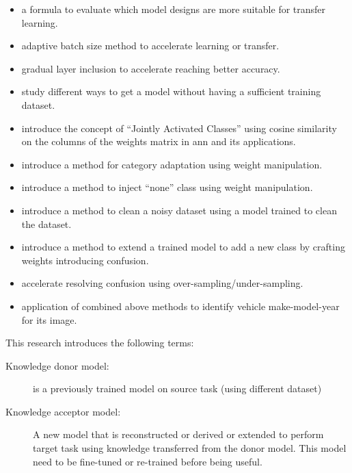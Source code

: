 \begin{itemize}
\item a formula to evaluate which model designs are more suitable for transfer learning.
\item adaptive batch size method to accelerate learning or transfer.
\item gradual layer inclusion to accelerate reaching better accuracy.
\item study different ways to get a model without having a sufficient training dataset.
\item introduce the concept of ``Jointly Activated Classes'' using cosine similarity on the columns of the weights matrix in \gls{ann} and its applications.
\item introduce a method for category adaptation using weight manipulation.
\item introduce a method to inject ``none'' class using weight manipulation.
\item introduce a method to clean a noisy dataset using a model trained to clean the dataset.
\item introduce a method to extend a trained model to add a new class by crafting weights introducing confusion.
\item accelerate resolving confusion using over-sampling/under-sampling.
\item application of combined above methods to identify vehicle make-model-year for its image.
\end{itemize}

This research introduces the following terms:
\begin{description}
\item [Knowledge donor model:] is a previously trained model on source task (using different dataset)
\item [Knowledge acceptor model:] A new model that is reconstructed or derived or extended to perform
    target task using knowledge transferred from the donor model. This model need to be fine-tuned
    or re-trained before being useful.
\end{description}

